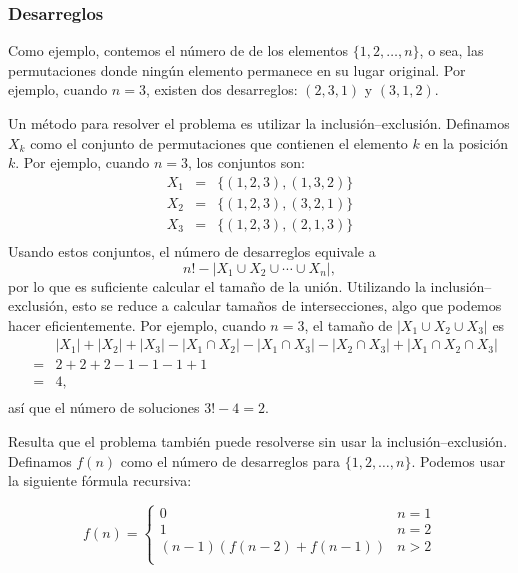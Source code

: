 \subsubsection{Desarreglos}


Como ejemplo, contemos el número de  de los elementos
$\{1,2,\ldots,n\}$, o sea, las permutaciones donde ningún elemento permanece
en su lugar original. Por ejemplo, cuando $n=3$, existen dos desarreglos:
$(2,3,1)$ y $(3,1,2)$.

Un método para resolver el problema es utilizar la inclusión--exclusión.
Definamos $X_k$ como el conjunto de permutaciones que contienen el elemento
$k$ en la posición $k$. Por ejemplo, cuando $n=3$, los conjuntos son:
\[
    \begin{array}{lcl}
        X_1 & = & \{(1,2,3),(1,3,2)\} \\
        X_2 & = & \{(1,2,3),(3,2,1)\} \\
        X_3 & = & \{(1,2,3),(2,1,3)\} \\
    \end{array}
\]
Usando estos conjuntos, el número de desarreglos equivale a
\[ n! - |X_1 \cup X_2 \cup \cdots \cup X_n|, \]
por lo que es suficiente calcular el tamaño de la unión. Utilizando la
inclusión--exclusión, esto se reduce a calcular tamaños de intersecciones,
algo que podemos hacer eficientemente. Por ejemplo, cuando $n=3$, el tamaño de
$|X_1 \cup X_2 \cup X_3|$ es
\[
    \begin{array}{lcl}
         &   & |X_1| + |X_2| + |X_3| - |X_1 \cap X_2|  - |X_1 \cap X_3|  - |X_2 \cap X_3| + |X_1 \cap X_2 \cap X_3| \\
         & = & 2+2+2-1-1-1+1                                                                                        \\
         & = & 4,                                                                                                   \\
    \end{array}
\]
así que el número de soluciones $3!-4=2$.

Resulta que el problema también puede resolverse sin usar la
inclusión--exclusión. Definamos $f(n)$ como el número de desarreglos para
$\{1,2,\ldots,n\}$. Podemos usar la siguiente fórmula recursiva:

\begin{equation*}
    f(n) = \begin{cases}
        0                      & n = 1 \\
        1                      & n = 2 \\
        (n-1)(f(n-2) + f(n-1)) & n>2   \\
    \end{cases}
\end{equation*}

